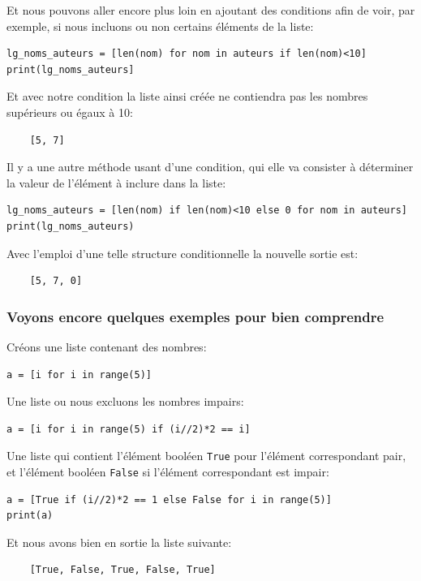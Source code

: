 \documentclass[a4paper,12pt]{book}
\begin{document}
Et nous pouvons aller encore plus loin en ajoutant des conditions afin de voir, par exemple, si nous incluons ou non certains éléments de la liste:
\begin{lstlisting}
lg_noms_auteurs = [len(nom) for nom in auteurs if len(nom)<10]
print(lg_noms_auteurs]
\end{lstlisting}
\medskip

Et avec notre condition la liste ainsi créée ne contiendra pas les nombres supérieurs ou égaux à 10:
\begin{verbatim}
    [5, 7]
\end{verbatim}
\medskip

Il y a une autre méthode usant d'une condition, qui elle va consister à déterminer la valeur de l'élément à inclure dans la liste:
\begin{lstlisting}
lg_noms_auteurs = [len(nom) if len(nom)<10 else 0 for nom in auteurs]
print(lg_noms_auteurs)
\end{lstlisting}
\medskip

Avec l'emploi d'une telle structure conditionnelle la nouvelle sortie est:
\begin{verbatim}
    [5, 7, 0]
\end{verbatim}
\medskip

\subsubsection*{Voyons encore quelques exemples pour bien comprendre}
Créons une liste contenant des nombres:
\begin{lstlisting}
a = [i for i in range(5)]
\end{lstlisting}
\medskip

Une liste ou nous excluons les nombres impairs:
\begin{lstlisting}
a = [i for i in range(5) if (i//2)*2 == i]
\end{lstlisting}
\medskip

Une liste qui contient l'élément booléen \texttt{True} pour l'élément correspondant pair, et l'élément booléen \texttt{False} si l'élément correspondant est impair:
\begin{lstlisting}
a = [True if (i//2)*2 == 1 else False for i in range(5)]
print(a)
\end{lstlisting}
\medskip

Et nous avons bien en sortie la liste suivante:
\begin{verbatim}
    [True, False, True, False, True]
\end{verbatim}
\medskip
\end{document}
